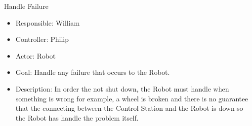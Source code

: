 Handle Failure
\begin{itemize}
    \item Responsible: William
    \item Controller: Philip
    \item Actor: Robot
    \item Goal: Handle any failure that occurs to the Robot.
    \item Description: In order the not shut down, the Robot must handle when something is wrong for example, a wheel is broken and there is no guarantee that the connecting between the Control Station and the Robot is down so the Robot has handle the problem itself.
\end{itemize}